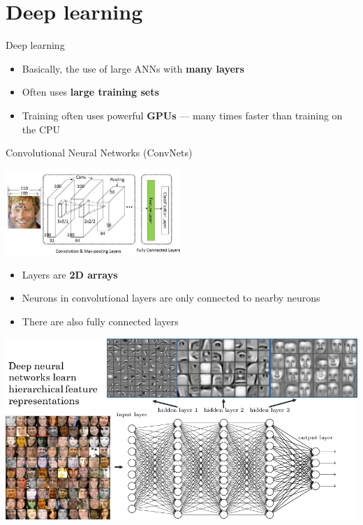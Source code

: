\part{Deep learning}
\frame{\partpage}

\begin{frame}{Deep learning}
	\begin{itemize}
		\pause\item Basically, the use of large ANNs with \textbf{many layers}
		\pause\item Often uses \textbf{large training sets}
		\pause\item Training often uses powerful \textbf{GPUs} --- many times faster than training on the CPU
	\end{itemize}
\end{frame}

\begin{frame}{Convolutional Neural Networks (ConvNets)}
	\begin{center}
		\includegraphics[width=0.5\textwidth]{convnet}
	\end{center}
	\begin{itemize}
		\pause\item Layers are \textbf{2D arrays}
		\pause\item Neurons in convolutional layers are only connected to nearby neurons
		\pause\item There are also fully connected layers
	\end{itemize}
\end{frame}

\begin{frame}
	\includegraphics[width=\textwidth]{convnet_face}
\end{frame}

